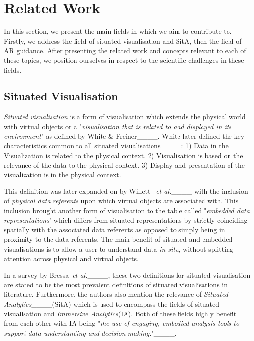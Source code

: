 \section{Related Work}
\label{sota}

In this section, we present the main fields in which we aim to contribute to. 
Firstly, we address the field of situated visualisation and SitA, then the field of AR guidance.
After presenting the related work and concepts relevant to each of these topics, we position ourselves in respect to the scientific challenges in these fields.

\subsection{Situated Visualisation}
\label{situated_visualisation}

\textit{Situated visualisation} is a form of visualisation which extends the physical world with virtual objects or a "\textit{visualisation that is related to and displayed in its environment}" as defined by White \& Freiner____. White later defined the key characteristics common to all situated visualisations____: 
1) Data in the Visualization is related to the physical context.
2) Visualization is based on the relevance of the data to the physical context.
3) Display and presentation of the visualization is in the physical context.

This definition was later expanded on by Willett ~\textit{et al.}____ with the inclusion of \textit{physical data referents} upon which virtual objects are associated with. This inclusion brought another form of visualisation to the table called "\textit{embedded data representations}" which differs from situated representations by strictly coinciding spatially with the associated data referents as opposed to simply being in proximity to the data referents. 
The main benefit of situated and embedded visualisations is to allow a user to understand data \textit{in situ}, without splitting attention across physical and virtual objects.

In a survey by Bressa~\textit{et al.}____,
these two definitions for situated visualisation are stated to be the most prevalent definitions of situated visualisations in literature. 
Furthermore, the authors also mention the relevance of \textit{Situated Analytics}____(SitA) which is used to encompass the fields of situated visualisation and \textit{Immersive Analytics}(IA). Both of these fields highly benefit from each other with IA being "\textit{the use of engaging, embodied analysis tools to support data understanding and decision making.}"____.

